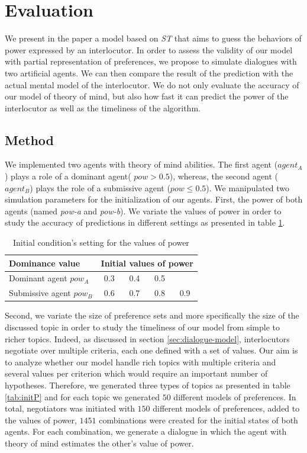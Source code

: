 \documentclass[conference, letterpaper]{IEEEtran}
\begin{document}
	
	\section{Evaluation}
	We present in the paper a model based on \emph{ST} that aims to guess the behaviors of power expressed by an interlocutor. In order to assess the validity of our model with partial representation of preferences, we propose to simulate dialogues with two artificial agents. We can then compare the result of the prediction with the actual mental model of the interlocutor. We do not only evaluate the accuracy of our model of theory of mind, but also how fast it can predict the power of the interlocutor as well as the timeliness of the algorithm.
	
	\subsection{Method}
	We implemented two agents with theory of mind abilities.
	The first agent ($agent_A$) plays a role of a dominant agent( $pow > 0.5$), whereas, the second agent ($agent_B$) plays the role of a submissive agent ($pow \leq 0.5$). 
	We manipulated two simulation parameters for the initialization of our agents. First, the power of both agents (named \emph{pow-a} and \emph{pow-b}). We variate the values of power in order to study the accuracy of predictions in different settings as presented in table \ref{tab:powsettings}.
	\begin{table}[t]
		\centering
		\caption{Initial condition's setting for the values of power} 
		\begin{tabular}{|l|cccc|}
			\hline 
			\textbf{Dominance value } &	\multicolumn{4}{c|}{ Initial values of power } \\
			\hline
			Dominant agent $pow_A$ & 0.3 & 0.4 & 0.5 &  \\
			\hline
			Submissive agent $pow_B$ & 0.6 & 0.7 & 0.8 & 0.9\\
			\hline
		\end{tabular}
		
		\label{tab:powsettings}
	\end{table}
	
	Second, we variate the size of preference sets and more specifically the size of the discussed topic in order to study the timeliness of our model from simple to richer topics. Indeed, as discussed in section \ref{sec:dialogue-model}, interlocutors negotiate over multiple criteria, each one defined with a set of values. Our aim is to analyze whether our model handle rich topics with multiple criteria and several values per criterion which would require an important number of hypotheses. Therefore, we generated three types of topics as presented in table \ref{tab:initP} and for each topic we generated $50$ different models of preferences. In total, negotiators was initiated with $150$ different models of preferences, added to the values of power,  $1451$ combinations were created for the initial states of both agents. For each combination, we generate a dialogue in which the agent with theory of mind estimates the other's value of power.
	
\end{document}
